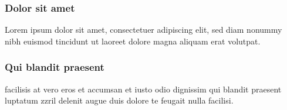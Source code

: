 \documentclass[]{/Users/chris/Documents/Studies/FHP/DFKI/metanetpaper/metanetpaper}
\begin{document}
	\subsubsection{Dolor sit amet}
	Lorem ipsum dolor sit amet, consectetuer adipiscing elit, sed diam nonummy nibh euismod tincidunt ut laoreet dolore magna aliquam erat volutpat.\\
	
	\subsubsection{Qui blandit praesent}
	facilisis at vero eros et accumsan et iusto odio dignissim qui blandit praesent luptatum zzril delenit augue duis dolore te feugait nulla facilisi.\\
	
	
	\clearpage
\end{document}
